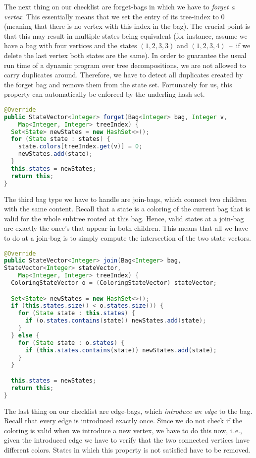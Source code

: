 \documentclass[a4paper, ukenglish, twoside, openright]{jdrasilmanual}
\begin{document}
The next thing on our checklist are forget-bags in which we have to
\emph{forget a vertex}. This essentially means that we set the entry
of its tree-index to $0$ (meaning that there is no vertex with this
index in the bag). The crucial point is that this may result in
multiple states being equivalent (for instance, assume we have a bag
with four vertices and the states $(1,2,3,3)$ and $(1,2,3,4)$~--~if we
delete the last vertex both states are the same). In order to
guarantee the usual run time of a dynamic program over tree
decompositions, we are not allowed to carry duplicates
around. Therefore, we have to detect all duplicates created by the
forget bag and remove them from the state set. Fortunately for us,
this property can automatically be enforced by the underling hash set.

\begin{lstlisting}[language=Java]
@Override
public StateVector<Integer> forget(Bag<Integer> bag, Integer v,
    Map<Integer, Integer> treeIndex) {
  Set<State> newStates = new HashSet<>();
  for (State state : states) {
    state.colors[treeIndex.get(v)] = 0;
    newStates.add(state);
  }
  this.states = newStates;
  return this;
}
\end{lstlisting}

The third bag type we have to handle are join-bags, which connect two
children with the same content. Recall that a state is a coloring of
the current bag that is valid for the whole subtree rooted at this
bag. Hence, valid states at a join-bag are exactly the once's that
appear in both children. This means that all we have to do at a join-bag is to simply compute the intersection of the two state vectors.

\begin{lstlisting}[language=Java]
@Override
public StateVector<Integer> join(Bag<Integer> bag,
StateVector<Integer> stateVector,
    Map<Integer, Integer> treeIndex) {
  ColoringStateVector o = (ColoringStateVector) stateVector;

  Set<State> newStates = new HashSet<>();
  if (this.states.size() < o.states.size()) {
    for (State state : this.states) {
      if (o.states.contains(state)) newStates.add(state);
    }
  } else {
    for (State state : o.states) {
      if (this.states.contains(state)) newStates.add(state);
    }
  }

  this.states = newStates;
  return this;
}
\end{lstlisting}

The last thing on our checklist are edge-bags, which \emph{introduce
  an edge} to the bag. Recall that every edge is introduced exactly
once. Since we do not check if the coloring is valid when we introduce
a new vertex, we have to do this now, i.\,e., given the introduced
edge we have to verify that the two connected vertices have different
colors. States in which this property is not satisfied have to be
removed.
\end{document}
